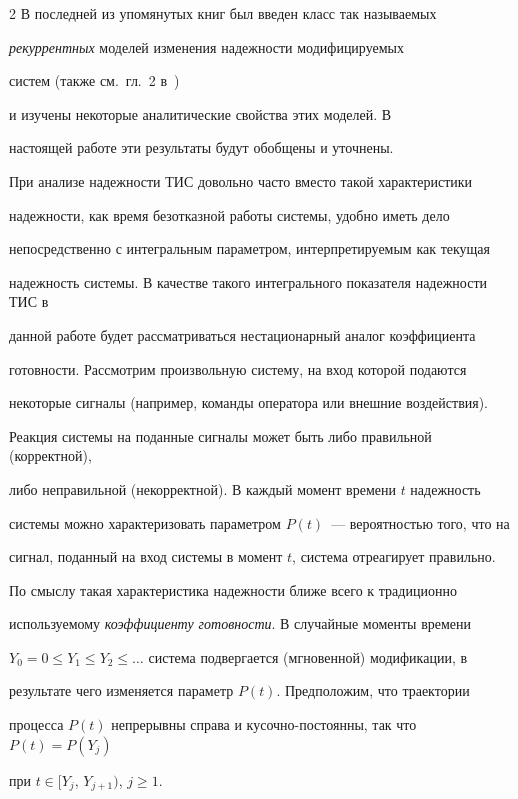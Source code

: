 \begin{multicols}{2}
В последней из упомянутых книг был введен класс так на\-зы\-ва\-емых


{\it рекуррентных} моделей изменения надежности модифицируемых


систем (также см.\ гл.~2 в~\cite{4art}) %


и изучены некоторые аналитические свойства этих моделей. В


настоящей работе эти результаты будут обобщены и уточнены.





При анализе надежности ТИС довольно часто вместо такой характеристики 


надежности, как время безотказной работы системы, удобно иметь дело 


непосредственно с интегральным параметром, интерпретируемым как текущая 


надежность системы. В качестве такого интегрального показателя надежности ТИС в 


данной работе будет рассматриваться нестационарный аналог коэффициента 


го\-тов\-ности. Рассмотрим произвольную систему, на вход которой подаются 


некоторые сигналы (например, команды оператора или внешние воздействия). 


Реакция системы на поданные сигналы может быть либо правильной (корректной), 


либо неправильной (некорректной). В каждый момент времени $t$ надежность 


системы можно характеризовать параметром $P(t)$~--- вероятностью того, что на 


сигнал, поданный на вход системы в момент $t$, сис\-те\-ма отреагирует правильно. 


По смыслу такая характеристика надежности ближе всего к традиционно 


используемому {\it коэффициенту готовности}. В случайные моменты времени 


$Y_0=0\le Y_1\le Y_2\le\ldots$ сис\-те\-ма подвергается (мгновенной) модификации, в 


результате чего изменяется параметр $P(t)$. Предположим, что траектории 


процесса $P(t)$ непрерывны справа и кусочно-постоянны, так что $P(t)=P(Y_j)$ 


при $t\in [Y_j,\,Y_{j+1})$, $j\ge1$.






\end{multicols}

